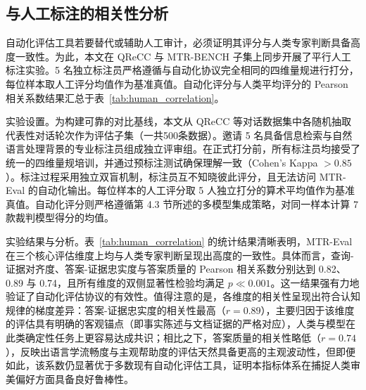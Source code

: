 


\subsection{与人工标注的相关性分析}



自动化评估工具若要替代或辅助人工审计，必须证明其评分与人类专家判断具备高度一致性。为此，本文在 QReCC 与 MTR-BENCH 子集上同步开展了平行人工标注实验。5 名独立标注员严格遵循与自动化协议完全相同的四维量规进行打分，每位样本取人工评分均值作为基准真值。自动化评分与人类平均评分的 Pearson 相关系数结果汇总于表~\ref{tab:human_correlation}。





实验设置。为构建可靠的对比基线，本文从 QReCC 等对话数据集中各随机抽取代表性对话轮次作为评估子集（一共500条数据）。邀请 5 名具备信息检索与自然语言处理背景的专业标注员组成独立评审组。在正式打分前，所有标注员均接受了统一的四维量规培训，并通过预标注测试确保理解一致（Cohen's Kappa $> 0.85$）。标注过程采用独立双盲机制，标注员互不知晓彼此评分，且无法访问 MTR-Eval 的自动化输出。每位样本的人工评分取 5 人独立打分的算术平均值作为基准真值。自动化评分则严格遵循第 4.3 节所述的多模型集成策略，对同一样本计算 7 款裁判模型得分的均值。


实验结果与分析。表~\ref{tab:human_correlation} 的统计结果清晰表明，MTR-Eval 在三个核心评估维度上均与人类专家判断呈现出高度的一致性。具体而言，查询-证据对齐度、答案-证据忠实度与答案质量的 Pearson 相关系数分别达到 0.82、0.89 与 0.74，且所有维度的双侧显著性检验均满足 $p \ll 0.001$。这一结果强有力地验证了自动化评估协议的有效性。值得注意的是，各维度的相关性呈现出符合认知规律的梯度差异：答案-证据忠实度的相关性最高（$r=0.89$），主要归因于该维度的评估具有明确的客观锚点（即事实陈述与文档证据的严格对应），人类与模型在此类确定性任务上更容易达成共识；相比之下，答案质量的相关性略低（$r=0.74$），反映出语言学流畅度与主观帮助度的评估天然具备更高的主观波动性，但即便如此，该系数仍显著优于多数现有自动化评估工具，证明本指标体系在捕捉人类审美偏好方面具备良好鲁棒性。



